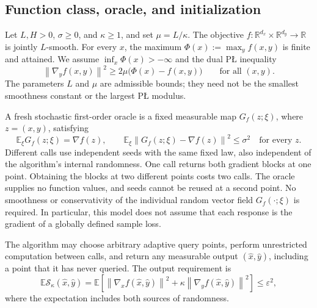 \documentclass[11pt,a4paper]{article}
\newcommand{\R}{\mathbb R}
\newcommand{\E}{\mathbb E}
\newcommand{\eps}{\varepsilon}
\newcommand{\norm}[1]{\left\lVert #1\right\rVert}
\newcommand{\res}{\mathcal S_\kappa}
\theoremstyle{definition}
\theoremstyle{remark}
\numberwithin{equation}{section}
\begin{document}
\subsection{Function class, oracle, and initialization}

Let $L,H>0$, $\sigma\ge0$, and $\kappa\ge1$, and set $\mu=L/\kappa$.
The objective $f:\R^{d_x}\times\R^{d_y}\to\R$ is jointly $L$-smooth.
For every $x$, the maximum
$\Phi(x):=\max_y f(x,y)$ is finite and attained. We assume
$\inf_x\Phi(x)>-\infty$ and the dual P\L{} inequality
\begin{equation}
 \norm{\nabla_y f(x,y)}^2
 \ge 2\mu\bigl(\Phi(x)-f(x,y)\bigr)
 \qquad\text{for all }(x,y).
 \label{eq:model-pl}
\end{equation}
The parameters $L$ and $\mu$ are admissible bounds; they need not be
the smallest smoothness constant or the largest P\L{} modulus.

A fresh stochastic first-order oracle is a fixed measurable map
$G_f(z;\xi)$, where $z=(x,y)$, satisfying
\begin{equation}
 \E_\xi G_f(z;\xi)=\nabla f(z),\qquad
 \E_\xi\norm{G_f(z;\xi)-\nabla f(z)}^2\le\sigma^2
 \quad\text{for every }z.
 \label{eq:model-oracle}
\end{equation}
Different calls use independent seeds with the same fixed law, also
independent of the algorithm's internal randomness. One call returns
both gradient blocks at one point. Obtaining the blocks at two different
points costs two calls. The oracle supplies no function values, and
seeds cannot be reused at a second point. No smoothness or
conservativity of the individual random vector field $G_f(\cdot;\xi)$
is required. In particular, this model does not assume that each
response is the gradient of a globally defined sample loss.

The algorithm may choose arbitrary adaptive query points, perform
unrestricted computation between calls, and return any measurable
output $(\widehat x,\widehat y)$, including a point that it has never
queried. The output requirement is
\begin{equation}
 \E\res(\widehat x,\widehat y)
 =\E\!\left[
 \norm{\nabla_x f(\widehat x,\widehat y)}^2
 +\kappa\norm{\nabla_y f(\widehat x,\widehat y)}^2
 \right]\le\eps^2,
 \label{eq:output-criterion}
\end{equation}
where the expectation includes both sources of randomness.
\end{document}
